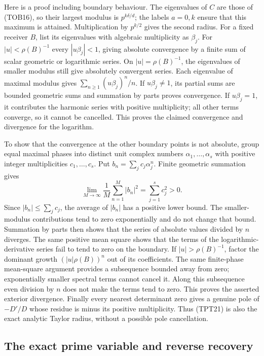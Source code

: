Here is a proof including boundary behaviour. The eigenvalues of $C$
are those of (TOB16), so their largest modulus is $p^{k\delta/d}$;
the labels $a=0,k$ ensure that this maximum is attained. Multiplication
by $p^{k/2}$ gives the second radius. For a fixed receiver $B$, list its
eigenvalues with algebraic multiplicity as $\beta_j$.
For $|u|<\rho(B)^{-1}$ every $|u\beta_j|<1$, giving absolute
convergence by a finite sum of scalar geometric or logarithmic series.
On $|u|=\rho(B)^{-1}$, the eigenvalues of smaller modulus still give
absolutely convergent series. Each eigenvalue of maximal modulus gives
$\sum_{n\ge1}(u\beta_j)^n/n$. If $u\beta_j\ne1$, its partial sums
are bounded geometric sums and summation by parts proves convergence.
If $u\beta_j=1$, it contributes the harmonic series with positive
multiplicity; all other terms converge, so it cannot be cancelled.
This proves the claimed convergence and divergence for the logarithm.

To show that the convergence at the other boundary points is not
absolute, group equal maximal phases into distinct unit complex numbers
$\alpha_1,\ldots,\alpha_s$ with positive integer multiplicities
$c_1,\ldots,c_s$. Put $b_n=\sum_jc_j\alpha_j^n$.
Finite geometric summation gives
\[
 \lim_{M\to\infty}\frac1M\sum_{n=1}^M|b_n|^2
        =\sum_{j=1}^s c_j^2>0.
\]
Since $|b_n|\le\sum_jc_j$, the average of $|b_n|$ has a positive
lower bound. The smaller-modulus contributions tend to zero
exponentially and do not change that bound. Summation by parts then
shows that the series of absolute values divided by $n$ diverges.
The same positive mean square shows that the terms of the
logarithmic-derivative series fail to tend to zero on the boundary.
If $|u|>\rho(B)^{-1}$, factor the dominant growth
$(|u|\rho(B))^n$ out of its coefficients. The same finite-phase
mean-square argument provides a subsequence bounded away from zero;
exponentially smaller spectral terms cannot cancel it. Along this
subsequence even division by $n$ does not make the terms tend to zero.
This proves the asserted exterior divergence.
Finally every nearest determinant zero gives a genuine pole of
$-D'/D$ whose residue is minus its positive multiplicity. Thus
(TPT21) is also the exact analytic Taylor radius, without a possible
pole cancellation.

\subsection{The exact prime variable and reverse recovery}

